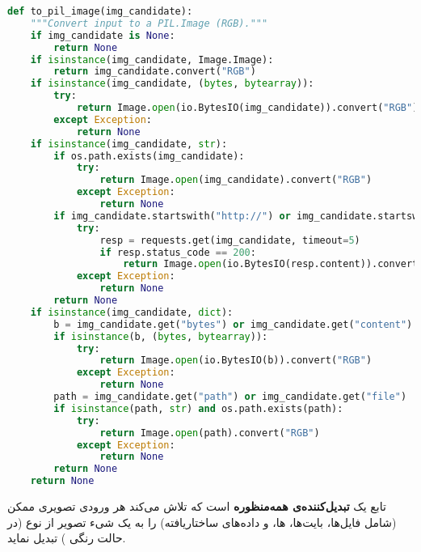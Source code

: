 \documentclass{article}
\begin{document}
\begin{latin}
\begin{lstlisting}[language=Python]
def to_pil_image(img_candidate):
    """Convert input to a PIL.Image (RGB)."""
    if img_candidate is None:
        return None
    if isinstance(img_candidate, Image.Image):
        return img_candidate.convert("RGB")
    if isinstance(img_candidate, (bytes, bytearray)):
        try:
            return Image.open(io.BytesIO(img_candidate)).convert("RGB")
        except Exception:
            return None
    if isinstance(img_candidate, str):
        if os.path.exists(img_candidate):
            try:
                return Image.open(img_candidate).convert("RGB")
            except Exception:
                return None
        if img_candidate.startswith("http://") or img_candidate.startswith("https://"):
            try:
                resp = requests.get(img_candidate, timeout=5)
                if resp.status_code == 200:
                    return Image.open(io.BytesIO(resp.content)).convert("RGB")
            except Exception:
                return None
        return None
    if isinstance(img_candidate, dict):
        b = img_candidate.get("bytes") or img_candidate.get("content") or img_candidate.get("data")
        if isinstance(b, (bytes, bytearray)):
            try:
                return Image.open(io.BytesIO(b)).convert("RGB")
            except Exception:
                return None
        path = img_candidate.get("path") or img_candidate.get("file")
        if isinstance(path, str) and os.path.exists(path):
            try:
                return Image.open(path).convert("RGB")
            except Exception:
                return None
        return None
    return None
\end{lstlisting}
\end{latin}

تابع  یک \textbf{تبدیل‌کننده‌ی همه‌منظوره} است که تلاش می‌کند هر ورودی تصویری ممکن (شامل فایل‌ها، بایت‌ها، ها، و داده‌های ساختاریافته) را به یک شیء تصویر از نوع  (در حالت رنگی ) تبدیل نماید.
\end{document}
